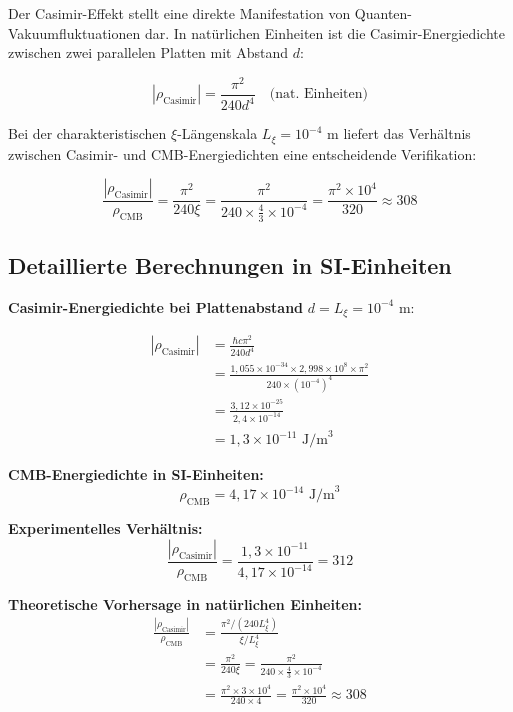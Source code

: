 	Der Casimir-Effekt stellt eine direkte Manifestation von Quanten-Vakuumfluktuationen dar. In natürlichen Einheiten ist die Casimir-Energiedichte zwischen zwei parallelen Platten mit Abstand $d$:
	
	\begin{equation}
		|\rho_{\text{Casimir}}| = \frac{\pi^2}{240 d^4} \quad \text{(nat. Einheiten)}
	\end{equation}
	
	Bei der charakteristischen $\xi$-Längenskala $L_\xi = 10^{-4}$ m liefert das Verhältnis zwischen Casimir- und CMB-Energiedichten eine entscheidende Verifikation:
	
	\begin{equation}
		\frac{|\rho_{\text{Casimir}}|}{\rho_{\text{CMB}}} = \frac{\pi^2}{240 \xi} = \frac{\pi^2}{240 \times \frac{4}{3} \times 10^{-4}} = \frac{\pi^2 \times 10^4}{320} \approx 308
	\end{equation}
	
	\subsection{Detaillierte Berechnungen in SI-Einheiten}
	
	\textbf{Casimir-Energiedichte bei Plattenabstand} $d = L_\xi = 10^{-4}$ m:
	
	\begin{align}
		|\rho_{\text{Casimir}}| &= \frac{\hbar c \pi^2}{240 d^4} \\
		&= \frac{1,055 \times 10^{-34} \times 2,998 \times 10^8 \times \pi^2}{240 \times (10^{-4})^4} \\
		&= \frac{3,12 \times 10^{-25}}{2,4 \times 10^{-14}} \\
		&= 1,3 \times 10^{-11} \text{ J/m}^3
	\end{align}
	
	\textbf{CMB-Energiedichte in SI-Einheiten:}
	\begin{equation}
		\rho_{\text{CMB}} = 4,17 \times 10^{-14} \text{ J/m}^3
	\end{equation}
	
	\textbf{Experimentelles Verhältnis:}
	\begin{equation}
		\frac{|\rho_{\text{Casimir}}|}{\rho_{\text{CMB}}} = \frac{1,3 \times 10^{-11}}{4,17 \times 10^{-14}} = 312
	\end{equation}
	
	\textbf{Theoretische Vorhersage in natürlichen Einheiten:}
	\begin{align}
		\frac{|\rho_{\text{Casimir}}|}{\rho_{\text{CMB}}} &= \frac{\pi^2 / (240 L_\xi^4)}{\xi / L_\xi^4} \\
		&= \frac{\pi^2}{240 \xi} = \frac{\pi^2}{240 \times \frac{4}{3} \times 10^{-4}} \\
		&= \frac{\pi^2 \times 3 \times 10^4}{240 \times 4} = \frac{\pi^2 \times 10^4}{320} \approx 308
	\end{align}
	
